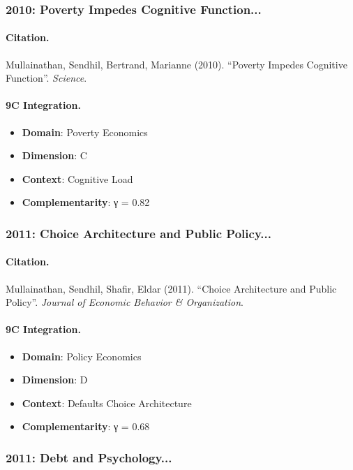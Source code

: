 \subsubsection{2010: Poverty Impedes Cognitive Function...}

\paragraph{Citation.}
Mullainathan, Sendhil, Bertrand, Marianne (2010). ``Poverty Impedes Cognitive Function''. \textit{Science}.

\paragraph{9C Integration.}
\begin{itemize}[nosep]
  \item \textbf{Domain}: Poverty Economics
  \item \textbf{Dimension}: C
  \item \textbf{Context}: Cognitive Load
  \item \textbf{Complementarity}: γ = 0.82
\end{itemize}


\subsubsection{2011: Choice Architecture and Public Policy...}

\paragraph{Citation.}
Mullainathan, Sendhil, Shafir, Eldar (2011). ``Choice Architecture and Public Policy''. \textit{Journal of Economic Behavior & Organization}.

\paragraph{9C Integration.}
\begin{itemize}[nosep]
  \item \textbf{Domain}: Policy Economics
  \item \textbf{Dimension}: D
  \item \textbf{Context}: Defaults Choice Architecture
  \item \textbf{Complementarity}: γ = 0.68
\end{itemize}


\subsubsection{2011: Debt and Psychology...}

